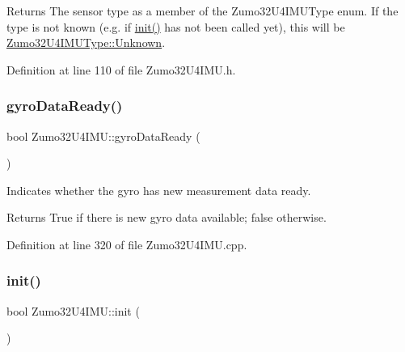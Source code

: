 \begin{DoxyReturn}{Returns}
The sensor type as a member of the Zumo32\+U4\+I\+M\+U\+Type enum. If the type is not known (e.\+g. if \hyperlink{class_zumo32_u4_i_m_u_aca2ae4fe4989453c2e4f73e9dc7439d2}{init()} has not been called yet), this will be \hyperlink{_zumo32_u4_i_m_u_8h_a2be3e50a86f638af5bb120cc740f3452a88183b946cc5f0e8c96b2e66e1c74a7e}{Zumo32\+U4\+I\+M\+U\+Type\+::\+Unknown}. 
\end{DoxyReturn}


Definition at line 110 of file Zumo32\+U4\+I\+M\+U.\+h.

\mbox{\label{class_zumo32_u4_i_m_u_a82a4b99d45afb0b5008e32213fa2e0cc}} 
\subsubsection{\texorpdfstring{gyro\+Data\+Ready()}{gyroDataReady()}}
{\footnotesize\ttfamily bool Zumo32\+U4\+I\+M\+U\+::gyro\+Data\+Ready (\begin{DoxyParamCaption}{ }\end{DoxyParamCaption})}



Indicates whether the gyro has new measurement data ready. 

\begin{DoxyReturn}{Returns}
True if there is new gyro data available; false otherwise. 
\end{DoxyReturn}


Definition at line 320 of file Zumo32\+U4\+I\+M\+U.\+cpp.

\mbox{\label{class_zumo32_u4_i_m_u_aca2ae4fe4989453c2e4f73e9dc7439d2}} 
\subsubsection{\texorpdfstring{init()}{init()}}
{\footnotesize\ttfamily bool Zumo32\+U4\+I\+M\+U\+::init (\begin{DoxyParamCaption}{ }\end{DoxyParamCaption})}



